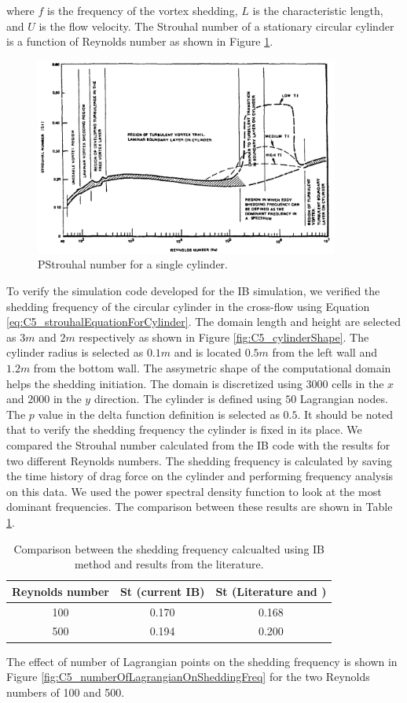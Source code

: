 %
where $f$ is the frequency of the vortex shedding, $L$ is the characteristic length, and $U$ is the flow velocity. The Strouhal number of a stationary circular cylinder is a function of Reynolds number \cite{chen1987flow} as shown in Figure \ref{fig:C5_strouhalVSreynoldsNumber}.
%
\begin{figure}[H]
    \centering
    \includegraphics[width=10.00cm]{Chapter_5/figure/StrouhalVsReynodsl.png}
    \caption{PStrouhal number for a single cylinder\cite{jendrzejczyk1985fluid}.}
    \label{fig:C5_strouhalVSreynoldsNumber}
\end{figure}
%
To verify the simulation code developed for the IB simulation, we verified the shedding frequency of the circular cylinder in the cross-flow using Equation \eqref{eq:C5_strouhalEquationForCylinder}. The domain length and height are selected as $3 m$ and $2 m$ respectively as shown in Figure \ref{fig:C5_cylinderShape}. The cylinder radius is selected as $0.1 m$ and is located $0.5 m$ from the left wall and $1.2 m$ from the bottom wall. The assymetric shape of the computational domain helps the shedding initiation. The domain is discretized using $3000$ cells in the $x$ and $2000$ in the $y$ direction. The cylinder is defined using $50$ Lagrangian nodes. The $p$ value in the delta function definition is selected as $0.5$. It should be noted that to verify the shedding frequency the cylinder is fixed in its place. We compared the Strouhal number calculated from the IB code with the results \cite{mittal2001control} for two different Reynolds numbers. The shedding frequency is calculated by saving the time history of drag force on the cylinder and performing frequency analysis on this data. We used the power spectral density function to look at the most dominant frequencies. The comparison between these results are shown in Table \ref{table:C5_strouhalVerification}.
%
\begin{table}[H]
\centering
\begin{tabular}{c | c | c}
     Reynolds number & St (current IB) & St (Literature \cite{mittal2001control} and \cite{jendrzejczyk1985fluid}) \\ \hline \hline
     100 & 0.170 & 0.168 \\ \hline
     500 & 0.194 & 0.200 \\
\end{tabular}
\caption{Comparison between the shedding frequency calcualted using IB method and results from the literature.}
\label{table:C5_strouhalVerification}
\end{table}
%
The effect of number of Lagrangian points on the shedding frequency is shown in Figure \ref{fig:C5_numberOfLagrangianOnSheddingFreq} for the two Reynolds numbers of 100 and 500.